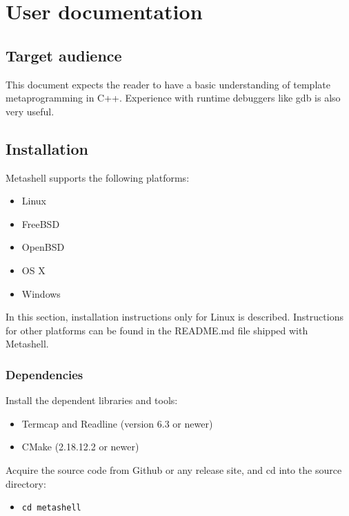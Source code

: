 
\chapter{User documentation}

\section{Target audience}

This document expects the reader to have a basic understanding of template
metaprogramming in C++.
\cite{using-cpp-metaprograms,generative-programming,functional-programming-cefp}
Experience with runtime debuggers like gdb\cite{gdb} is also very useful.

\section{Installation}

Metashell supports the following platforms:
\begin{itemize}
    \item Linux
    \item FreeBSD
    \item OpenBSD
    \item OS X
    \item Windows
\end{itemize}

In this section, installation instructions only for Linux is described.
Instructions for other platforms can be found in the README.md file shipped
with Metashell.

\subsection{Dependencies}

Install the dependent libraries and tools:

\begin{itemize}
    \item Termcap and Readline\cite{readline} (version 6.3 or newer)
    \item CMake\cite{cmake} (2.18.12.2 or newer)
\end{itemize}

Acquire the source code from Github\cite{github} or any release site, and cd
into the source directory:

\begin{itemize}
    \item \texttt{cd metashell}
\end{itemize}

